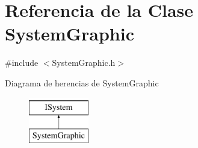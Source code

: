 \hypertarget{classSystemGraphic}{}\section{Referencia de la Clase System\+Graphic}
\label{classSystemGraphic}


{\ttfamily \#include $<$System\+Graphic.\+h$>$}

Diagrama de herencias de System\+Graphic\begin{figure}[H]
\begin{center}
\leavevmode
\includegraphics[height=2.000000cm]{classSystemGraphic}
\end{center}
\end{figure}
